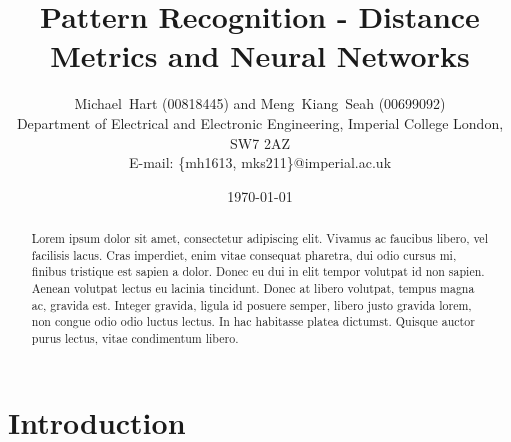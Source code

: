 \documentclass[a4paper, 10pt, conference]{ieeeconf}
\begin{document}
\title{Pattern Recognition - Distance Metrics and Neural Networks}
\author{Michael~Hart (00818445) and
        Meng~Kiang~Seah (00699092)
\\
        Department of Electrical and Electronic Engineering,
        Imperial College London,
        SW7 2AZ
\\
        E-mail: \{mh1613, mks211\}@imperial.ac.uk}
\date{\today}




\maketitle


\begin{abstract}
 Lorem ipsum dolor sit amet, consectetur adipiscing elit. Vivamus ac faucibus libero, vel facilisis lacus. Cras imperdiet, enim vitae consequat pharetra, dui odio cursus mi, finibus tristique est sapien a dolor. Donec eu dui in elit tempor volutpat id non sapien. Aenean volutpat lectus eu lacinia tincidunt. Donec at libero volutpat, tempus magna ac, gravida est. Integer gravida, ligula id posuere semper, libero justo gravida lorem, non congue odio odio luctus lectus. In hac habitasse platea dictumst. Quisque auctor purus lectus, vitae condimentum libero.
\end{abstract}

\section{Introduction}
\end{document}

